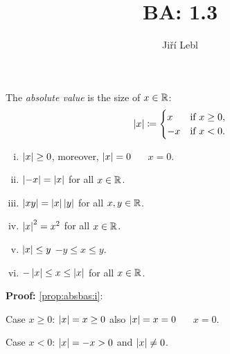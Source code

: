 \documentclass[10pt,aspectratio=169]{beamer}
\author{Ji\v{r}\'i Lebl}
\institute[OSU]{%
Departemento pri Matematiko de Oklahoma {\^S}tata Universitato}
\title{BA: 1.3}
\date{}
\begin{document}
\begin{frame}
\titlepage
\end{frame}

\begin{frame}
The \emph{absolute value} is the size of $x \in {\mathbb{R}}$:
\[
\left\lvert {x} \right\rvert \coloneqq
\begin{cases}
x & \text{if } x \geq 0, \\
-x & \text{if } x < 0 .
\end{cases}
\]

\pause

\begin{proposition}
\begin{enumerate}[(i)]
\item \label{prop:absbas:i} $\left\lvert {x} \right\rvert \geq 0$, \quad moreover, $\left\lvert {x} \right\rvert=0$ ~\iffif~ $x = 0$.
\item \pause \label{prop:absbas:ii} $\left\lvert {-x} \right\rvert = \left\lvert {x} \right\rvert$ \quad for all $x \in {\mathbb{R}}$.
\item \pause \label{prop:absbas:iii} $\left\lvert {xy} \right\rvert = \left\lvert {x} \right\rvert\left\lvert {y} \right\rvert$ \quad for all $x,y \in {\mathbb{R}}$.
\item \pause \label{prop:absbas:iv} $\left\lvert {x} \right\rvert^2 = x^2$ \quad for all $x \in {\mathbb{R}}$.
\item \pause \label{prop:absbas:v} $\left\lvert {x} \right\rvert \leq y$ \wiffif $-y \leq x \leq y$.
\item \pause \label{prop:absbas:vi} $-\left\lvert {x} \right\rvert \leq x \leq \left\lvert {x} \right\rvert$ \quad for all $x \in {\mathbb{R}}$.
\end{enumerate}
\end{proposition}

\pause

\textbf{Proof:}
\eqref{prop:absbas:i}:

Case $x \geq 0$:
\quad
\pause
$\left\lvert {x} \right\rvert = x \geq 0$
\quad
\pause
also $\left\lvert {x} \right\rvert = x = 0$ ~\iffif~ $x=0$.

\pause
Case $x < 0$:
\quad
$\left\lvert {x} \right\rvert = -x > 0$ \quad \pause and $\left\lvert {x} \right\rvert \not= 0$.

\end{frame}
\end{document}

